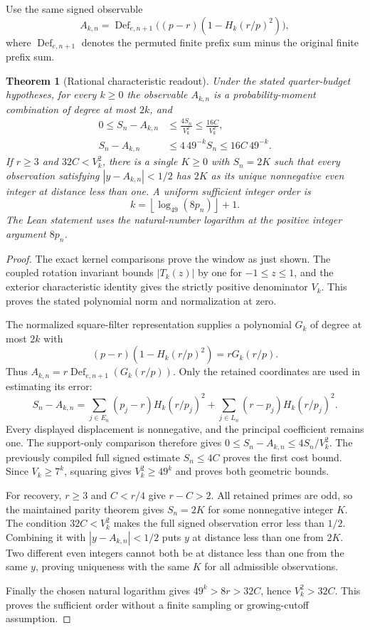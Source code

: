 \documentclass[11pt]{article}
\newtheorem{theorem}{Theorem}[section]
\theoremstyle{definition}
\begin{document}
Use the same signed observable
\[
 A_{k,n}=\operatorname{Def}_{e,n+1}
       \bigl((p-r)(1-H_k(r/p)^2)\bigr),
\]
where $\operatorname{Def}_{e,n+1}$ denotes the permuted finite
prefix sum minus the original finite prefix sum.

\begin{theorem}[Rational characteristic readout]
Under the stated quarter-budget hypotheses, for every $k\ge0$ the
observable $A_{k,n}$ is a probability-moment combination of degree
at most $2k$, and
\[
 \begin{split}
 0\le S_n-A_{k,n}
   &\le\frac{4S_n}{V_k^2}\le\frac{16C}{V_k^2},\\
 S_n-A_{k,n}
   &\le4\,49^{-k}S_n\le16C\,49^{-k}.
 \end{split}
\]
If $r\ge3$ and $32C<V_k^2$, there is a single $K\ge0$ with
$S_n=2K$ such that every observation satisfying
$|y-A_{k,n}|<1/2$ has $2K$ as its unique nonnegative even integer
at distance less than one.
A uniform sufficient integer order is
\[
 k=\left\lfloor\log_{49}(8p_n)\right\rfloor+1.
\]
The Lean statement uses the natural-number logarithm at the positive
integer argument $8p_n$.
\end{theorem}

\begin{proof}
The exact kernel comparisons prove the window as just shown.
The coupled rotation invariant bounds $|T_k(z)|$ by one for
$-1\le z\le1$, and the exterior characteristic identity gives the
strictly positive denominator $V_k$. This proves the stated
polynomial norm and normalization at zero.

The normalized square-filter representation supplies a polynomial
$G_k$ of degree at most $2k$ with
\[
 (p-r)(1-H_k(r/p)^2)=rG_k(r/p).
\]
Thus $A_{k,n}=r\operatorname{Def}_{e,n+1}(G_k(r/p))$.
Only the retained coordinates are used in estimating its error:
\[
 S_n-A_{k,n}=
   \sum_{j\in E_n}(p_j-r)H_k(r/p_j)^2+
   \sum_{j\in L_n}(r-p_j)H_k(r/p_j)^2.
\]
Every displayed displacement is nonnegative, and the principal
coefficient remains one. The support-only comparison therefore gives
$0\le S_n-A_{k,n}\le4S_n/V_k^2$.
The previously compiled full signed estimate $S_n\le4C$ proves
the first cost bound. Since $V_k\ge7^k$, squaring gives
$V_k^2\ge49^k$ and proves both geometric bounds.

For recovery, $r\ge3$ and $C<r/4$ give $r-C>2$.
All retained primes are odd, so the maintained parity theorem gives
$S_n=2K$ for some nonnegative integer $K$.
The condition $32C<V_k^2$ makes the full signed observation error
less than $1/2$. Combining it with $|y-A_{k,n}|<1/2$ puts $y$
at distance less than one from $2K$.
Two different even integers cannot both be at distance less than one
from the same $y$, proving uniqueness with the same $K$ for all
admissible observations.

Finally the chosen natural logarithm gives
$49^k>8r>32C$, hence $V_k^2>32C$. This proves the sufficient
order without a finite sampling or growing-cutoff assumption.
\end{proof}
\end{document}
